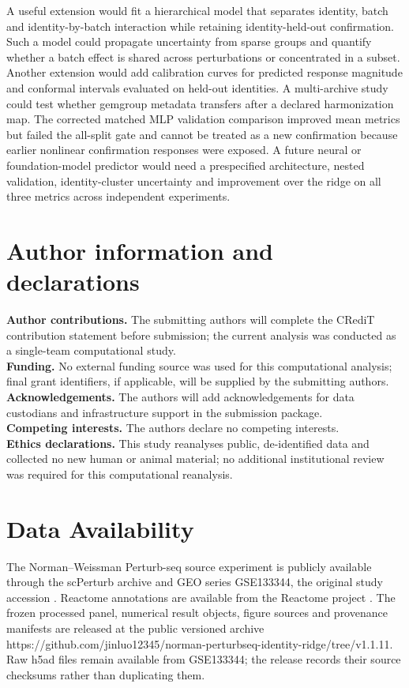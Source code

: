\documentclass[10pt]{article}
\begin{document}
A useful extension would fit a hierarchical model that separates identity, batch and identity-by-batch interaction while retaining identity-held-out confirmation. Such a model could propagate uncertainty from sparse groups and quantify whether a batch effect is shared across perturbations or concentrated in a subset. Another extension would add calibration curves for predicted response magnitude and conformal intervals evaluated on held-out identities. A multi-archive study could test whether gemgroup metadata transfers after a declared harmonization map. The corrected matched MLP validation comparison improved mean metrics but failed the all-split gate and cannot be treated as a new confirmation because earlier nonlinear confirmation responses were exposed. A future neural or foundation-model predictor would need a prespecified architecture, nested validation, identity-cluster uncertainty and improvement over the ridge on all three metrics across independent experiments.

\section*{Author information and declarations}
\textbf{Author contributions.} The submitting authors will complete the CRediT contribution statement before submission; the current analysis was conducted as a single-team computational study.\\
\textbf{Funding.} No external funding source was used for this computational analysis; final grant identifiers, if applicable, will be supplied by the submitting authors.\\
\textbf{Acknowledgements.} The authors will add acknowledgements for data custodians and infrastructure support in the submission package.\\
\textbf{Competing interests.} The authors declare no competing interests.\\
\textbf{Ethics declarations.} This study reanalyses public, de-identified data and collected no new human or animal material; no additional institutional review was required for this computational reanalysis.

\section{Data Availability}
The Norman--Weissman Perturb-seq source experiment is publicly available through the scPerturb archive and GEO series GSE133344, the original study accession \citep{pmid31395745}. Reactome annotations are available from the Reactome project \citep{reactome2020}. The frozen processed panel, numerical result objects, figure sources and provenance manifests are released at the public versioned archive https://github.com/jinluo12345/norman-perturbseq-identity-ridge/tree/v1.1.11. Raw h5ad files remain available from GSE133344; the release records their source checksums rather than duplicating them.
\end{document}
